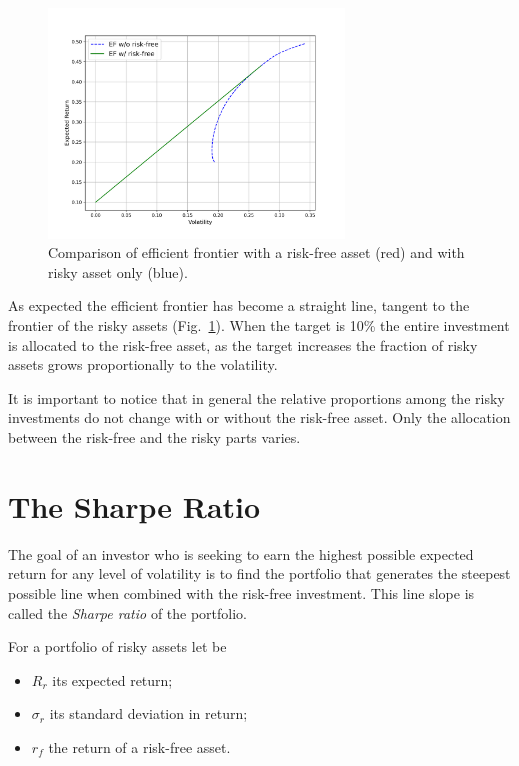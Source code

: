 
\begin{figure}[htb]
\centering
\includegraphics[width=0.7\textwidth]{figures/cal}
\caption{Comparison of efficient frontier with a risk-free asset (red) and with risky asset only (blue).}
\label{fig:cal}
\end{figure}
    
As expected the efficient frontier has become a straight line, tangent to the frontier of the risky assets (Fig.~\ref{fig:cal}). When the target is 10\% the entire investment is allocated to the risk-free asset, as the target increases the fraction of risky assets grows proportionally to the volatility. 

It is important to notice that in general the relative proportions among the risky investments do not change with or without the risk-free asset. Only the allocation between the risk-free and the risky parts varies.

\section{The Sharpe Ratio}
\label{the-sharpe-ratio}
The goal of an investor who is seeking to earn the highest possible expected return for any level of volatility is to find the portfolio that generates the steepest possible line when combined with the risk-free investment. This line slope is called the \emph{Sharpe ratio} of the portfolio.

For a portfolio of risky assets let be

\begin{itemize}
\tightlist
\item \(R_r\) its expected return;
\item \(\sigma_r\) its standard deviation in return;
\item \(r_f\) the return of a risk-free asset.
\end{itemize}

